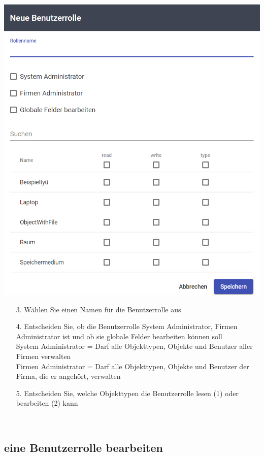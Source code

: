 \documentclass[11pt,a4paper]{report}
\begin{document}
	\begin{minipage}{0.5\linewidth}
	\includegraphics[width=\linewidth]{Rollen.png}
	\end{minipage}
	\hfill
	\begin{minipage}{0.4\linewidth}
	\begin{itemize}
		\item[3.] Wählen Sie einen Namen für die Benutzerrolle aus
		\item[4.] Entscheiden Sie, ob die Benutzerrolle System Administrator, Firmen Administrator ist und ob sie globale Felder bearbeiten können soll\\
		System Administrator = Darf alle Objekttypen, Objekte und Benutzer aller Firmen verwalten\\
		Firmen Administrator = Darf alle Objekttypen, Objekte und Benutzer der Firma, die er angehört, verwalten
		\item[5.] Entscheiden Sie, welche Objekttypen die Benutzerrolle lesen (1) oder bearbeiten (2) kann
	\end{itemize}
	\end{minipage}\\

	\subsection{eine Benutzerrolle bearbeiten}
\end{document}
